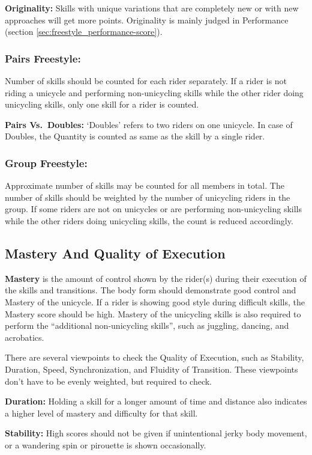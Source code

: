 \textbf{Originality:} Skills with unique variations that are completely new or with new approaches will get more points.
Originality is mainly judged in Performance (section \ref{sec:freestyle_performance-score}).

\subsubsection{Pairs Freestyle:}
Number of skills should be counted for each rider separately.
If a rider is not riding a unicycle and performing non-unicycling skills while the other rider doing unicycling skills, only one skill for a rider is counted.

\textbf{Pairs Vs.\ Doubles:} `Doubles' refers to two riders on one unicycle.
In case of Doubles, the Quantity is counted as same as the skill by a single rider.

\subsubsection{Group Freestyle:}
Approximate number of skills may be counted for all members in total.
The number of skills should be weighted by the number of unicycling riders in the group.
If some riders are not on unicycles or are performing non-unicycling skills while the other riders doing unicycling skills, the count is reduced accordingly.

\subsection{Mastery And Quality of Execution}
\textbf{Mastery} is the amount of control shown by the rider(s) during their execution of the skills and transitions.
The body form should demonstrate good control and Mastery of the unicycle.
If a rider is showing good style during difficult skills, the Mastery score should be high.
Mastery of the unicycling skills is also required to perform the ``additional non-unicycling skills'', such as juggling, dancing, and acrobatics.

There are several viewpoints to check the Quality of Execution, such as Stability, Duration, Speed, Synchronization, and Fluidity of Transition.
These viewpoints don't have to be evenly weighted, but required to check.

\textbf{Duration:} Holding a skill for a longer amount of time and distance also indicates a higher level of mastery and difficulty for that skill.

\textbf{Stability:} High scores should not be given if unintentional jerky body movement, or a wandering spin or pirouette is shown occasionally.

